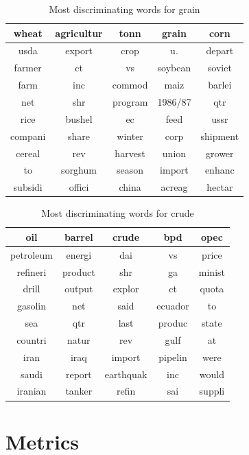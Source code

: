 \documentclass{article}
\begin{document}
\begin{table}[H]
	\caption{Most discriminating words for grain}
	\centering
	\begin{tabular}{|c|c|c|c|c|}
		\hline
		wheat & agricultur & tonn & grain & corn \\
		\hline
		usda & export & crop & u. & depart \\
		\hline
		farmer & ct & vs & soybean & soviet \\
		\hline
		farm & inc & commod & maiz & barlei \\
		\hline
		net & shr & program & 1986/87 & qtr \\
		\hline
		rice & bushel & ec & feed & ussr \\
		\hline
		compani & share & winter & corp & shipment \\
		\hline
		cereal & rev & harvest & union & grower \\
		\hline
		to & sorghum & season & import & enhanc \\
		\hline
		subsidi & offici & china & acreag & hectar \\
		\hline
	\end{tabular}
\end{table}

\begin{table}[H]
	\caption{Most discriminating words for crude}
	\centering
	\begin{tabular}{|c|c|c|c|c|}
		\hline
		oil & barrel & crude & bpd & opec \\
		\hline
		petroleum & energi & dai & vs & price \\
		\hline
		refineri & product & shr & ga & minist \\
		\hline
		drill & output & explor & ct & quota \\
		\hline
		gasolin & net & said & ecuador & to \\
		\hline
		sea & qtr & last & produc & state \\
		\hline
		countri & natur & rev & gulf & at \\
		\hline
		iran & iraq & import & pipelin & were \\
		\hline
		saudi & report & earthquak & inc & would \\
		\hline
		iranian & tanker & refin & sai & suppli \\
		\hline
	\end{tabular}
\end{table}

\section{Metrics}
\end{document}
